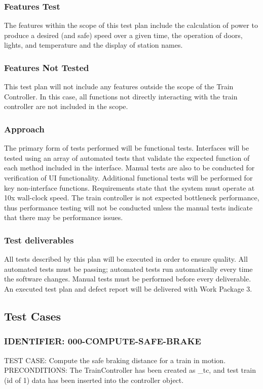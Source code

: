 \documentclass{scrreprt}
\begin{document}
\subsubsection{Features Test}
The features within the scope of this test plan include the calculation of power to produce a desired (and safe) speed over a given time, the operation of doors, lights, and temperature and the display of station names.

\subsubsection{Features Not Tested}
This test plan will not include any features outside the scope of the Train Controller. In this case, all functions not directly interacting with the train controller are not included in the scope.

\subsubsection{Approach}
The primary form of tests performed will be functional tests. Interfaces will be tested using an array of automated tests that validate the expected function of each method included in the interface. Manual tests are also to be conducted for verification of UI functionality.  Additional functional tests will be performed for key non-interface functions. Requirements state that the system must operate at 10x wall-clock speed. The train controller is not expected bottleneck performance, thus performance testing will not be conducted unless the manual tests indicate that there may be performance issues.

\subsubsection{Test deliverables}
All tests described by this plan will be executed in order to ensure quality. All automated tests must be passing; automated tests run automatically every time the software changes. Manual tests must be performed before every deliverable. An executed test plan and defect report will be delivered with Work Package 3.

\subsection{Test Cases}

\subsubsection{IDENTIFIER: 000-COMPUTE-SAFE-BRAKE}
TEST CASE: Compute the safe braking distance for a train in motion.
PRECONDITIONS: The TrainController has been created as _tc, and test train (id of 1) data has been inserted into the controller object.
\end{document}
